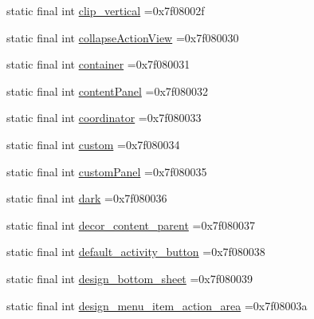 \begin{DoxyCompactItemize}
\item 
static final int \mbox{\hyperlink{classbr_1_1unb_1_1cic_1_1mp_1_1marketmaster_1_1test_1_1R_1_1id_a205689f2e61753dc71e1c1186b31d8b7}{clip\+\_\+vertical}} =0x7f08002f
\item 
static final int \mbox{\hyperlink{classbr_1_1unb_1_1cic_1_1mp_1_1marketmaster_1_1test_1_1R_1_1id_a37d04520fa71c714bc93a7496a9a7390}{collapse\+Action\+View}} =0x7f080030
\item 
static final int \mbox{\hyperlink{classbr_1_1unb_1_1cic_1_1mp_1_1marketmaster_1_1test_1_1R_1_1id_ac05094258fd87f8680e3e5c46400c95d}{container}} =0x7f080031
\item 
static final int \mbox{\hyperlink{classbr_1_1unb_1_1cic_1_1mp_1_1marketmaster_1_1test_1_1R_1_1id_a2f0d152770f9eb9358d1384fcd25ae80}{content\+Panel}} =0x7f080032
\item 
static final int \mbox{\hyperlink{classbr_1_1unb_1_1cic_1_1mp_1_1marketmaster_1_1test_1_1R_1_1id_a243f8b5a0c440ede7b28bee32dfdd2e1}{coordinator}} =0x7f080033
\item 
static final int \mbox{\hyperlink{classbr_1_1unb_1_1cic_1_1mp_1_1marketmaster_1_1test_1_1R_1_1id_af820efb2f045c27a4d32e2ae6c68480a}{custom}} =0x7f080034
\item 
static final int \mbox{\hyperlink{classbr_1_1unb_1_1cic_1_1mp_1_1marketmaster_1_1test_1_1R_1_1id_a7a7e7a13abd04947056f26a4c85af5d4}{custom\+Panel}} =0x7f080035
\item 
static final int \mbox{\hyperlink{classbr_1_1unb_1_1cic_1_1mp_1_1marketmaster_1_1test_1_1R_1_1id_aaada803c110d2dbfd1727521ad92cb52}{dark}} =0x7f080036
\item 
static final int \mbox{\hyperlink{classbr_1_1unb_1_1cic_1_1mp_1_1marketmaster_1_1test_1_1R_1_1id_aea96121ad92fbb66279f9a6bbff474bb}{decor\+\_\+content\+\_\+parent}} =0x7f080037
\item 
static final int \mbox{\hyperlink{classbr_1_1unb_1_1cic_1_1mp_1_1marketmaster_1_1test_1_1R_1_1id_aaad59c513e0e0906979e4872e535f5b0}{default\+\_\+activity\+\_\+button}} =0x7f080038
\item 
static final int \mbox{\hyperlink{classbr_1_1unb_1_1cic_1_1mp_1_1marketmaster_1_1test_1_1R_1_1id_aaf450ae43f11b04db5e260fb966d6eb3}{design\+\_\+bottom\+\_\+sheet}} =0x7f080039
\item 
static final int \mbox{\hyperlink{classbr_1_1unb_1_1cic_1_1mp_1_1marketmaster_1_1test_1_1R_1_1id_ad109be6252dd26da011fe60f49dd9307}{design\+\_\+menu\+\_\+item\+\_\+action\+\_\+area}} =0x7f08003a
\item 

\end{DoxyCompactItemize}
